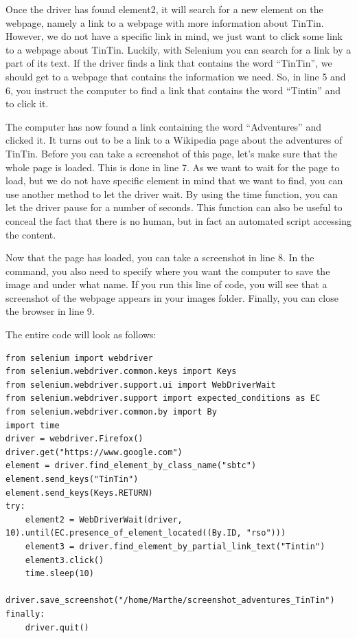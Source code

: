 \documentclass[a4paper,12pt]{book}
\begin{document}
\begin{appendices}
Once the driver has found element2, it will search for a new element on the webpage, namely a link to a webpage with more information about TinTin. However, we do not have a specific link in mind, we just want to click some link to a webpage about TinTin. Luckily, with Selenium you can search for a link by a part of its text. If the driver finds a link that contains the word “TinTin”, we should get to a webpage that contains the information we need. So, in line 5 and 6, you instruct the computer to find a link that contains the word ``Tintin'' and to click it. 


The computer has now found a link containing the word ``Adventures'' and clicked it. It turns out to be a link to a Wikipedia page about the adventures of TinTin. Before you can take a screenshot of this page, let’s make sure that the whole page is loaded. This is done in line 7. As we want to wait for the page to load, but we do not have specific element in mind that we want to find, you can use another method to let the driver wait. By using the time function, you can let the driver pause for a number of seconds. This function can also be useful to conceal the fact that there is no human, but in fact an automated script accessing the content.

Now that the page has loaded, you can take a screenshot in line 8. In the command, you also need to specify where you want the computer to save the image and under what name. If you run this line of code, you will see that a screenshot of the webpage appears in your images folder. Finally, you can close the browser in line 9.  



The entire code will look as follows:
\begin{lstlisting}
from selenium import webdriver
from selenium.webdriver.common.keys import Keys
from selenium.webdriver.support.ui import WebDriverWait
from selenium.webdriver.support import expected_conditions as EC 
from selenium.webdriver.common.by import By
import time
driver = webdriver.Firefox()
driver.get("https://www.google.com")  
element = driver.find_element_by_class_name("sbtc")
element.send_keys("TinTin")
element.send_keys(Keys.RETURN)
try:
    element2 = WebDriverWait(driver, 10).until(EC.presence_of_element_located((By.ID, "rso")))
    element3 = driver.find_element_by_partial_link_text("Tintin")
    element3.click()
    time.sleep(10)
    driver.save_screenshot("/home/Marthe/screenshot_adventures_TinTin")
finally:
    driver.quit()
\end{lstlisting}




\end{appendices}
\end{document}
